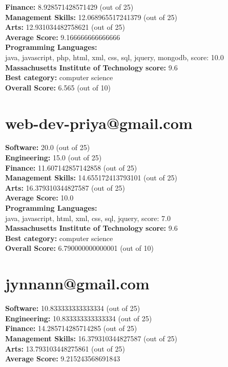 \documentclass{article}
\begin{document}
\textbf{Finance:} 8.928571428571429 (out of 25)\\
\textbf{Management Skills:} 12.068965517241379 (out of 25)\\
\textbf{Arts:} 12.931034482758621 (out of 25)\\
\textbf{Average Score: } 9.166666666666666\\
\textbf{Programming Languages:} \\
java, javascript, php, html, xml, css, sql, jquery, mongodb, score: 10.0\\
\textbf{Massachusetts Institute of Technology} \textbf{score:} 9.6\\
\textbf{Best category: } computer science\\
\textbf{Overall Score: }6.565 (out of 10)\section{web-dev-priya@gmail.com}
\textbf{Software:} 20.0 (out of 25)\\
\textbf{Engineering: } 15.0 (out of 25)\\
\textbf{Finance:} 11.607142857142858 (out of 25)\\
\textbf{Management Skills:} 14.655172413793101 (out of 25)\\
\textbf{Arts:} 16.379310344827587 (out of 25)\\
\textbf{Average Score: } 10.0\\
\textbf{Programming Languages:} \\
java, javascript, html, xml, css, sql, jquery, score: 7.0\\
\textbf{Massachusetts Institute of Technology} \textbf{score:} 9.6\\
\textbf{Best category: } computer science\\
\textbf{Overall Score: }6.790000000000001 (out of 10)\section{jynnann@gmail.com}
\textbf{Software:} 10.833333333333334 (out of 25)\\
\textbf{Engineering: } 10.833333333333334 (out of 25)\\
\textbf{Finance:} 14.285714285714285 (out of 25)\\
\textbf{Management Skills:} 16.379310344827587 (out of 25)\\
\textbf{Arts:} 13.793103448275861 (out of 25)\\
\textbf{Average Score: } 9.215243568691843\\
\end{document}
